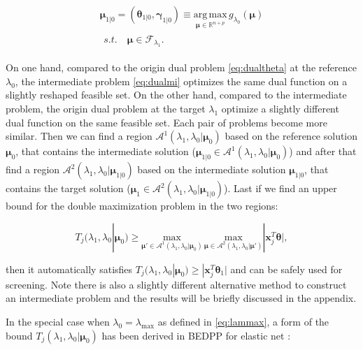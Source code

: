 \begin{gather}
        \label{eq:dualmi}
        \boldsymbol\mu_{1|0}=(\boldsymbol\theta_{1|0},\boldsymbol\gamma_{1|0})\equiv\underset{\boldsymbol\mu\in \mathbb{R}^{ n+p}}{\mathrm{arg\,max}}\,g_{\lambda_0}(\boldsymbol\mu)\\
        \begin{aligned}s.t.\quad \boldsymbol\mu\in \mathcal{F}_{\lambda_1}\nonumber.
        \end{aligned}
\end{gather}

On one hand, compared to the origin dual problem \eqref{eq:dualtheta} at the reference $\lambda_0$, the intermediate problem \eqref{eq:dualmi} optimizes the same dual function on a slightly reshaped feasible set. On the other hand, compared to the intermediate problem, the origin dual problem at the target $\lambda_1$ optimize a slightly different dual function on the same feasible set. Each pair of problems become more similar. Then we can find a region $\mathcal{A}^1(\lambda_1,\lambda_0|\boldsymbol\mu_0)$ based on the reference solution $\boldsymbol\mu_0$, that contains the intermediate solution ($\boldsymbol\mu_{1|0}\in \mathcal{A}^1(\lambda_1,\lambda_0|\boldsymbol\mu_0)$) and after that find a region $\mathcal{A}^2(\lambda_1,\lambda_0|\boldsymbol\mu_{1|0})$ based on the intermediate solution $\boldsymbol\mu_{1|0}$, that contains the target solution  ($\boldsymbol\mu_1\in \mathcal{A}^2(\lambda_1,\lambda_0|\boldsymbol\mu_{1|0})$). Last if we find an upper bound for the double maximization problem in the two regions:

\begin{equation}
    \label{eq:boundbound}
    T_j(\lambda_{1},\lambda_{0}|\boldsymbol\mu_0)\geq \underset{\boldsymbol\mu'\in\mathcal{A}^1(\lambda_1,\lambda_0|\boldsymbol\mu_0)}{\mathrm{max}}\,\underset{\boldsymbol\mu\in\mathcal{A}^2(\lambda_1,\lambda_0|\boldsymbol\mu')}{\mathrm{max}}|\boldsymbol x_j^T\boldsymbol\theta|,
\end{equation}

then it automatically satisfies $T_j(\lambda_{1},\lambda_{0}|\boldsymbol\mu_0)\geq |\boldsymbol x_j^T\boldsymbol\theta_1|$ and can be safely used for screening. Note there is also a slightly different alternative method to construct an intermediate problem and the results will be briefly discussed in the appendix.

In the special case when $\lambda_0=\lambda_{\max}$ as defined in \eqref{eq:lammax}, a form of the bound $T_j(\lambda_{1},\lambda_{0}|\boldsymbol\mu_0)$ has been derived in BEDPP for elastic net \citep{Zeng2021}:

